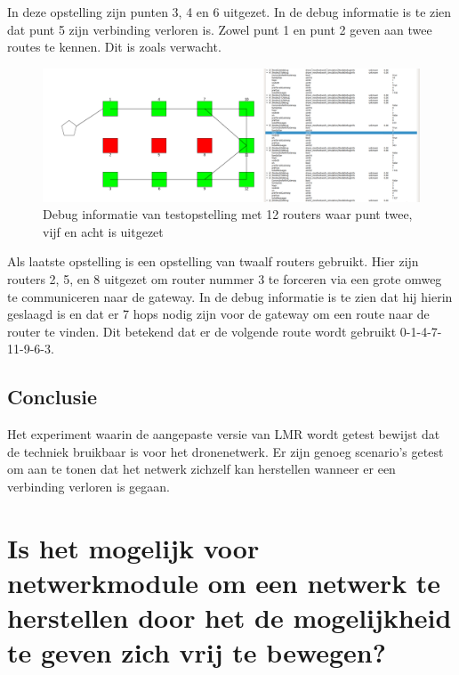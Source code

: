\documentclass[a4paper, 11pt, oneside]{report}
\begin{document}
In deze opstelling zijn punten 3, 4 en 6 uitgezet. In de debug informatie is te zien dat punt 5 zijn verbinding verloren is.
Zowel punt 1 en punt 2 geven aan twee routes te kennen.
Dit is zoals verwacht.

\begin{figure}[H]
	\begin{center}\includegraphics[width=\linewidth]{Afbeeldingen/testopstelling2_met_twaalf_drie_routers_uit.png}\end{center}
	\caption{Debug informatie van testopstelling met 12 routers waar punt twee, vijf en acht is uitgezet}
	\label{fig:applicatie-testopstelling-gateway-twaalf-routers}
\end{figure}

Als laatste opstelling is een opstelling van twaalf routers gebruikt.
Hier zijn routers 2, 5, en 8 uitgezet om router nummer 3 te forceren via een grote omweg te communiceren naar de gateway.
In de debug informatie is te zien dat hij hierin geslaagd is en dat er 7 hops nodig zijn voor de gateway om een route naar de router te vinden.
Dit betekend dat er de volgende route wordt gebruikt 0-1-4-7-11-9-6-3.

\subsection{Conclusie}

Het experiment waarin de aangepaste versie van LMR wordt getest bewijst dat de techniek bruikbaar is voor het dronenetwerk.
Er zijn genoeg scenario's getest om aan te tonen dat het netwerk zichzelf kan herstellen wanneer er een verbinding verloren is gegaan.

\section[Netwerkherstel door beweging  drone]{Is het mogelijk voor netwerkmodule om een netwerk te herstellen door het de mogelijkheid te geven zich vrij te bewegen?}
\label{experimenten:herstelnetwerk}
\end{document}
